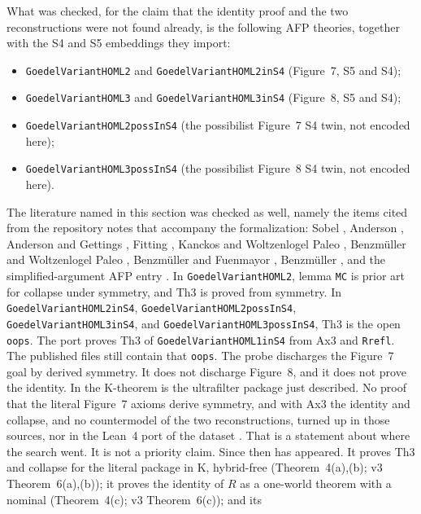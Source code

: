 \documentclass[11pt,a4paper]{article}
\newcommand{\lean}[1]{\texttt{#1}}
\theoremstyle{definition}
\theoremstyle{remark}
\begin{document}
What was checked, for the claim that the identity proof and the two
reconstructions were not found already, is the following AFP theories,
together with the S4 and S5 embeddings they import:
\begin{itemize}[leftmargin=1.5em]
\item \lean{GoedelVariantHOML2} and \lean{GoedelVariantHOML2inS4} (Figure~7, S5 and S4);
\item \lean{GoedelVariantHOML3} and \lean{GoedelVariantHOML3inS4} (Figure~8, S5 and S4);
\item \lean{GoedelVariantHOML2possInS4} (the possibilist Figure~7 S4 twin, not encoded here);
\item \lean{GoedelVariantHOML3possInS4} (the possibilist Figure~8 S4 twin, not encoded here).
\end{itemize}
The literature named in this section was checked as well, namely the items
cited from the repository notes that accompany the formalization:
Sobel
\cite{sobel1987,sobel2004}, Anderson \cite{anderson1990}, Anderson and Gettings
\cite{andersonGettings1996}, Fitting \cite{fitting2002}, Kanckos and
Woltzenlogel Paleo \cite{kanckos2017}, Benzm\"uller and Woltzenlogel Paleo
\cite{benzmuellerPaleo2014}, Benzm\"uller and Fuenmayor
\cite{benzmuellerFuenmayor2020}, Benzm\"uller \cite{benzmueller2026}, and the
simplified-argument AFP entry \cite{afpSimplified2021}.
In \lean{GoedelVariantHOML2}, lemma \lean{MC} is prior art for collapse under
symmetry, and Th3 is proved from symmetry.
In \lean{GoedelVariantHOML2inS4}, \lean{GoedelVariantHOML2possInS4},
\lean{GoedelVariantHOML3inS4}, and \lean{GoedelVariantHOML3possInS4}, Th3 is
the open \lean{oops}.
The port proves Th3 of \lean{GoedelVariantHOML1inS4} from Ax3 and \lean{Rrefl}.
The published files still contain that \lean{oops}.
The probe discharges the Figure~7 goal by derived symmetry.
It does not discharge Figure~8, and it does not prove the identity.
In \cite{benzmueller2026} the K-theorem is the ultrafilter package just
described.
No proof that the literal Figure~7 axioms derive symmetry, and with Ax3 the
identity and collapse, and no countermodel of the two reconstructions, turned
up in those sources, nor in the Lean~4 port of the dataset
\cite{benzmuellerLean2026}.
That is a statement about where the search went.
It is not a priority claim.
Since then \cite{benzmuellerPWN2026} has appeared.
It proves Th3 and collapse for the literal package in K, hybrid-free
(Theorem~4(a),(b); v3 Theorem~6(a),(b)); it proves the identity of \(R\) as a one-world theorem
with a nominal (Theorem~4(c); v3 Theorem~6(c)); and its
\end{document}
